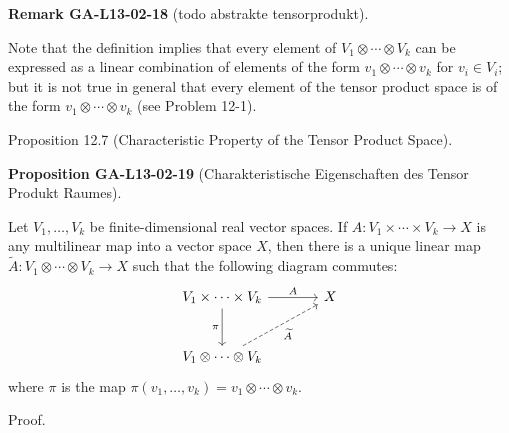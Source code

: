\documentclass[10pt, letterpaper]{article}
\newcommand{\CustomHeading}[3]{%
  \par\medskip\noindent%
  \textbf{#1 #2} \textnormal{(#3)}.\enskip%
}
\newenvironment{PROP}[2]{\begin{unitbox}\CustomHeading{Proposition}{#1}{#2}}{\end{unitbox}}
\newenvironment{REM}[2]{\begin{unitbox}\CustomHeading{Remark}{#1}{#2}}{\end{unitbox}}
\begin{document}
\begin{REM}{GA-L13-02-18}{todo abstrakte tensorprodukt}
Note that the definition implies that every element of $V_{1} \otimes \cdots \otimes V_{k}$ can be expressed as a linear combination of elements of the form $v_{1} \otimes \cdots \otimes v_{k}$ for $v_{i} \in V_{i}$; but it is not true in general that every element of the tensor product space is of the form $v_{1} \otimes \cdots \otimes v_{k}$ (see Problem 12-1).
\end{REM}

Proposition 12.7 (Characteristic Property of the Tensor Product Space). 


\begin{PROP}{GA-L13-02-19}{Charakteristische Eigenschaften des Tensor Produkt Raumes}
Let $V_{1}, \ldots, V_{k}$ be finite-dimensional real vector spaces. If $A: V_{1} \times \cdots \times V_{k} \rightarrow X$ is any multilinear map into a vector space $X$, then there is a unique linear map $\tilde{A}: V_{1} \otimes \cdots \otimes V_{k} \rightarrow X$ such that the following diagram commutes:\\
\[
\begin{tikzcd}[row sep=large, column sep=large]
V_1 \times \cdots \times V_k \arrow[r, "A"] \arrow[d, "\pi"'] & X \\
V_1 \otimes \cdots \otimes V_k \arrow[ru, dashed, "\widetilde{A}"']
\end{tikzcd}
\]
where $\pi$ is the map $\pi\left(v_{1}, \ldots, v_{k}\right)=v_{1} \otimes \cdots \otimes v_{k}$.
\end{PROP}


Proof. 
\end{document}
